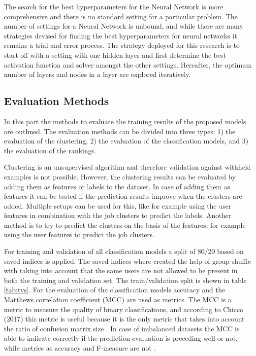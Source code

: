The search for the best hyperparameters for the Neural Network is more comprehensive and there is no standard setting for a particular problem. 
The number of settings for a Neural Network is unbound, and while there are many strategies devised for finding the best hyperparameters for neural networks \cite{larochelle2009exploring} it remains a trial and error process.
The strategy deployed for this research is to start off with a setting with one hidden layer and first determine the best activation function and solver amongst the other settings.
Hereafter, the optimum number of layers and nodes in a layer are explored iteratively.

\subsection{Evaluation Methods}
\label{ssec:eval}
In this part the methods to evaluate the training results of the proposed models are outlined.
The evaluation methods can be divided into three types: 1) the evaluation of the clustering, 2) the evaluation of the classification models, and 3) the evaluation of the rankings.

Clustering is an unsupervised algorithm and therefore validation against withheld examples is not possible.
However, the clustering results can be evaluated by adding them as features or labels to the dataset.
In case of adding them as features it can be tested if the prediction results improve when the clusters are added.
Multiple setups can be used for this, like for example using the user features in combination with the job clusters to predict the labels.
Another method is to try to predict the clusters on the basis of the features, for example using the user features to predict the job clusters. 

For training and validation of all classification models a split of 80/20 based on saved indices is applied. 
The saved indices where created the help of group shuffle with taking into account that the same users are not allowed to be present in both the training and validation set.
The train/validation split is shown in table \ref{tab:tvs}.
For the evaluation of the classification models accuracy and the Matthews correlation coefficient (MCC) \cite{matthews1975comparison} are used as metrics.
The MCC is a metric to measure the quality of binary classifications, and according to Chicco (2017) this metric is useful because it is the only metric that takes into account the ratio of confusion matrix size \cite{chicco2017ten}.
In case of imbalanced datasets the MCC is able to indicate correctly if the prediction evaluation is preceding well or not, while metrics as accuracy and F-measure are not \cite{boughorbel2017optimal}.

